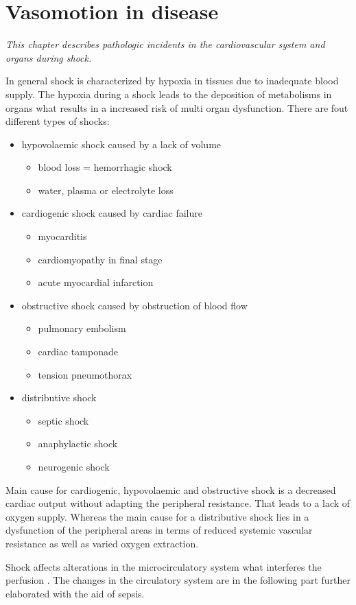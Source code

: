 \chapter{Vasomotion in disease}
\textit{This chapter describes pathologic incidents in the cardiovascular system and organs during shock.}

In general shock is characterized by hypoxia in tissues due to inadequate blood supply. The hypoxia during a shock leads to the deposition of metabolisms in organs what results in a increased risk of multi organ dysfunction. 
There are fout different types of shocks: \cite{lauridsen2015;vincent2013}
\begin{itemize}
	\item hypovolaemic shock caused by a lack of volume
	\begin{itemize}
		\item blood loss = hemorrhagic shock
		\item water, plasma or electrolyte loss
	\end{itemize}
	\item cardiogenic shock caused by cardiac failure
	\begin{itemize}
		\item myocarditis
		\item cardiomyopathy in final stage
		\item acute myocardial infarction
	\end{itemize}
	\item obstructive shock caused by obstruction of blood flow
	\begin{itemize}
		\item pulmonary embolism
		\item cardiac tamponade
		\item tension pneumothorax
	\end{itemize} 
	\item distributive shock
	\begin{itemize}
		\item septic shock
		\item anaphylactic shock
		\item neurogenic shock
	\end{itemize}
\end{itemize}

Main cause for cardiogenic, hypovolaemic and obstructive shock is a decreased cardiac output without adapting the peripheral resistance. That leads to a lack of oxygen supply.
Whereas the main cause for a distributive shock lies in a dysfunction of the peripheral areas in terms of reduced systemic vascular resistance as well as varied oxygen extraction. \cite{vincent2013}

Shock affects alterations in the microcirculatory system what interferes the perfusion \cite{maier2012}. The changes in the circulatory system are in the following part further elaborated with the aid of sepsis.